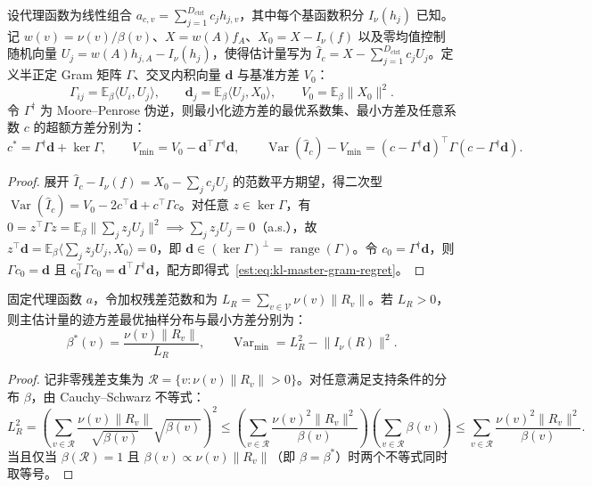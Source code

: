 \documentclass[lang=cn,scheme=chinese,openany]{elegantbook}
\newcommand{\E}{\mathbb E}
\newcommand{\Var}{\operatorname{Var}}
\begin{document}
\begin{theorem}
\label{est:thm:kl-master-gram}
设代理函数为线性组合 $a_{c,v}=\sum_{j=1}^{D_{\mathrm{ctrl}}}c_j h_{j,v}$，其中每个基函数积分 $I_\nu(h_j)$ 已知。记 $w(v)=\nu(v)/\beta(v)$、$X=w(A)f_A$、$X_0=X-I_\nu(f)$ 以及零均值控制随机向量 $U_j=w(A)h_{j,A}-I_\nu(h_j)$，使得估计量写为 $\widehat I_c=X-\sum_{j=1}^{D_{\mathrm{ctrl}}}c_j U_j$。定义半正定 Gram 矩阵 $\Gamma$、交叉内积向量 $\mathbf d$ 与基准方差 $V_0$：
\begin{equation*}
 \Gamma_{ij}=\E_\beta\langle U_i,U_j\rangle,\qquad
 \mathbf d_j=\E_\beta\langle U_j,X_0\rangle,\qquad
 V_0=\E_\beta\lVert X_0\rVert^2.
\end{equation*}
令 $\Gamma^\dagger$ 为 Moore--Penrose 伪逆，则最小化迹方差的最优系数集、最小方差及任意系数 $c$ 的超额方差分别为：
\begin{equation}
 c^*=\Gamma^\dagger\mathbf d+\ker\Gamma,\qquad
 V_{\min}=V_0-\mathbf d^\top\Gamma^\dagger\mathbf d,\qquad
 \Var(\widehat I_c)-V_{\min}
 =(c-\Gamma^\dagger\mathbf d)^\top\Gamma(c-\Gamma^\dagger\mathbf d).
 \label{est:eq:kl-master-gram-regret}
\end{equation}
\end{theorem}
\begin{proof}
展开 $\widehat I_c-I_\nu(f)=X_0-\sum_j c_j U_j$ 的范数平方期望，得二次型 $\Var(\widehat I_c)=V_0-2c^\top\mathbf d+c^\top\Gamma c$。对任意 $z\in\ker\Gamma$，有 $0=z^\top\Gamma z=\E_\beta\|\sum_j z_j U_j\|^2\implies \sum_j z_j U_j=0$（a.s.），故 $z^\top\mathbf d=\E_\beta\langle\sum_j z_j U_j,X_0\rangle=0$，即 $\mathbf d\in(\ker\Gamma)^\perp=\operatorname{range}(\Gamma)$。令 $c_0=\Gamma^\dagger\mathbf d$，则 $\Gamma c_0=\mathbf d$ 且 $c_0^\top\Gamma c_0=\mathbf d^\top\Gamma^\dagger\mathbf d$，配方即得式~\eqref{est:eq:kl-master-gram-regret}。
\end{proof}

\begin{theorem}[固定残差下的迹方差最优抽样提案分布]
\label{est:thm:kl-master-proposal}
固定代理函数 $a$，令加权残差范数和为 $L_R=\sum_{v\in\mathcal V}\nu(v)\lVert R_v\rVert$。若 $L_R>0$，则主估计量的迹方差最优抽样分布与最小方差分别为：
\begin{equation*}
 \beta^*(v)=\frac{\nu(v)\lVert R_v\rVert}{L_R},\qquad
 \Var_{\min}=L_R^2-\lVert I_\nu(R)\rVert^2.
\end{equation*}
\end{theorem}
\begin{proof}
记非零残差支集为 $\mathcal R=\{v:\nu(v)\|R_v\|>0\}$。对任意满足支持条件的分布 $\beta$，由 Cauchy--Schwarz 不等式：
\begin{equation*}
 L_R^2
 =\left(\sum_{v\in\mathcal R}\frac{\nu(v)\lVert R_v\rVert}{\sqrt{\beta(v)}}\sqrt{\beta(v)}\right)^2
 \le\left(\sum_{v\in\mathcal R}\frac{\nu(v)^2\lVert R_v\rVert^2}{\beta(v)}\right)
       \left(\sum_{v\in\mathcal R}\beta(v)\right)
 \le\sum_{v\in\mathcal R}\frac{\nu(v)^2\lVert R_v\rVert^2}{\beta(v)}.
\end{equation*}
当且仅当 $\beta(\mathcal R)=1$ 且 $\beta(v)\propto\nu(v)\|R_v\|$（即 $\beta=\beta^*$）时两个不等式同时取等号。
\end{proof}
\end{document}
